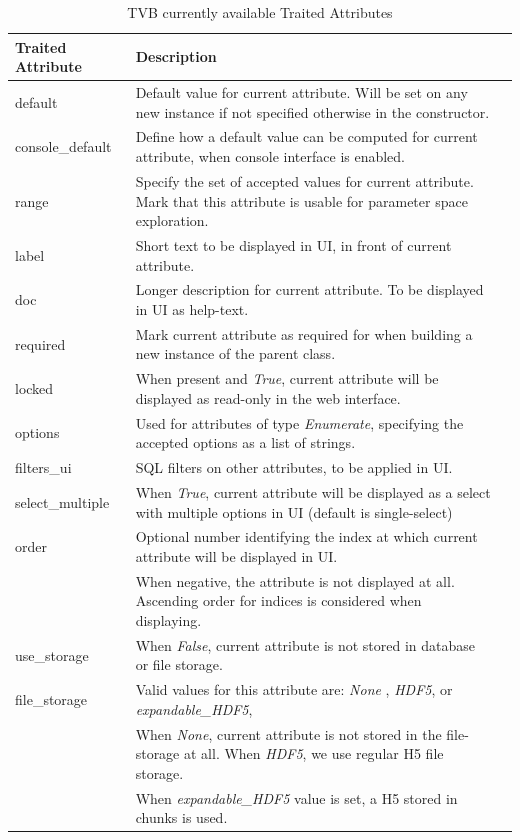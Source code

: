 \documentclass{bioinfo}
\begin{document}
\begin{center}
	\begin{table}[ht]

	\begin{tabularx}{\textwidth}{lll}
      		\toprule
      		Traited Attribute    & Description  \\ 
      		\midrule
		default 	& Default value for current attribute. Will be set on any new instance if not specified otherwise in the constructor.  \\
		console\_default & Define how a default value can be computed for current attribute, when console interface is enabled. \\
		range	& Specify the set of accepted values for current attribute. Mark that this attribute is usable for parameter space exploration. \\

		label		& Short text to be displayed in UI, in front of current attribute. \\
		doc		& Longer description for current attribute. To be displayed in UI as help-text. \\
		required	& Mark current attribute as required for when building a new instance of the parent class. \\
		locked	& When present and \emph{True}, current attribute will be displayed as read-only in the web interface. \\

		options	& Used for attributes of type \emph{Enumerate}, specifying the accepted options as a list of strings. \\
		filters\_ui	& SQL filters on other attributes, to be applied in UI. \\
		select\_multiple & When \emph{True}, current attribute will be displayed as a select with multiple options in UI (default is single-select) \\
		order	& Optional number identifying the index at which current attribute will be displayed in UI. \\
				& When negative, the attribute is not displayed at all. Ascending order for indices is considered when displaying. \\

		use\_storage	& When \emph{False}, current attribute is not stored in database or file storage. \\
		file\_storage	& Valid values for this attribute are: \emph{None} , \emph{HDF5}, or  \emph{expandable\_HDF5}, \\
					& When \emph{None}, current attribute is not stored in the file-storage at all. When \emph{HDF5}, we use regular H5 file storage. \\
					& When \emph{expandable\_HDF5} value is set, a H5 stored in chunks is used. \\
		\bottomrule
    	\end{tabularx}
  	\caption{TVB currently available Traited Attributes}
  	\label{tab:traits}
	\end{table}
\end{center}
\end{document}
